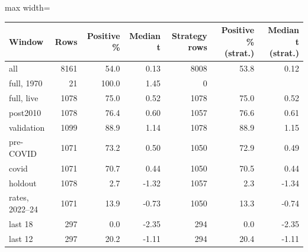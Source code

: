 \begin{adjustbox}{max width=\linewidth}
\begin{tabular}{lrrrrrr}
\toprule
Window & Rows & Positive \% & Median t & Strategy rows & Positive \% (strat.) & Median t (strat.) \\
\midrule
all & 8161 & 54.0 & 0.13 & 8008 & 53.8 & 0.12 \\
full, 1970 & 21 & 100.0 & 1.45 & 0 &  &  \\
full, live & 1078 & 75.0 & 0.52 & 1078 & 75.0 & 0.52 \\
post2010 & 1078 & 76.4 & 0.60 & 1057 & 76.6 & 0.61 \\
validation & 1099 & 88.9 & 1.14 & 1078 & 88.9 & 1.15 \\
pre-COVID & 1071 & 73.2 & 0.50 & 1050 & 72.9 & 0.49 \\
covid & 1071 & 70.7 & 0.44 & 1050 & 70.5 & 0.44 \\
holdout & 1078 & 2.7 & -1.32 & 1057 & 2.3 & -1.34 \\
rates, 2022--24 & 1071 & 13.9 & -0.73 & 1050 & 13.3 & -0.74 \\
last 18 & 297 & 0.0 & -2.35 & 294 & 0.0 & -2.35 \\
last 12 & 297 & 20.2 & -1.11 & 294 & 20.4 & -1.11 \\
\bottomrule
\end{tabular}
\end{adjustbox}
\par{}
